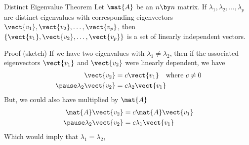 \documentclass{beamer}
\begin{document}
\begin{frame}
\begin{block}{Distinct Eigenvalue Theorem}
Let $\mat{A}$ be an $n\by n$ matrix. If $\lambda_1, \lambda_2, \ldots, \lambda_p$ are distinct eigenvalues with corresponding eigenvectors $\vect{v_1}, \vect{v_2}, \ldots, \vect{v_p}$, then $\left\{\vect{v_1}, \vect{v_2}, \ldots, \vect{v_p}\right\}$ is a set of linearly independent vectors.
\end{block}\pause
\begin{block}{Proof (sketch)}
If we have two eigenvalues with $\lambda_1\neq\lambda_2$, then if the associated eigenvectors $\vect{v_1}$ and $\vect{v_2}$ were linearly dependent, we have
\begin{equation*}
\begin{aligned}
\vect{v_2}&=c\vect{v_1}\quad\text{where $c\neq 0$}\\\pause
\lambda_2\vect{v_2} &= c\lambda_2\vect{v_1}
\end{aligned}
\end{equation*}\pause
But, we could also have multiplied by $\mat{A}$
\begin{equation*}
\begin{aligned}
\mat{A}\vect{v_2} &= c\mat{A}\vect{v_1}\\\pause
\lambda_2\vect{v_2} &= c\lambda_1\vect{v_1}
\end{aligned}
\end{equation*}\pause
Which would imply that $\lambda_1=\lambda_2$,
\end{block}
\end{frame}
\end{document}
